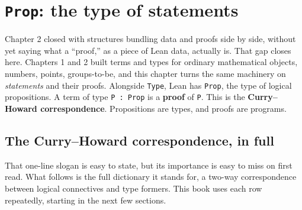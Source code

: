 \section{\texorpdfstring{\texttt{Prop}: the type of statements}{Prop: the type of statements}}\label{sec:03-propositions-and-proofs:01-prop:1}

Chapter 2 closed with structures bundling data and proofs side by side, without yet saying what a ``proof,'' as a piece of Lean data, actually is. That gap closes here. Chapters 1 and 2 built terms and types for ordinary mathematical objects, numbers, points, groups-to-be, and this chapter turns the same machinery on \emph{statements} and their proofs. Alongside \texttt{Type}, Lean has \texttt{Prop}, the type of logical propositions. A term of type \texttt{P : Prop} is a \textbf{proof} of \texttt{P}. This is the \textbf{Curry--Howard correspondence}. Propositions are types, and proofs are programs.

\subsection{The Curry--Howard correspondence, in full}\label{sec:03-propositions-and-proofs:01-prop:2}

That one-line slogan is easy to state, but its importance is easy to miss on first read. What follows is the full dictionary it stands for, a two-way correspondence between logical connectives and type formers. This book uses each row repeatedly, starting in the next few sections.

